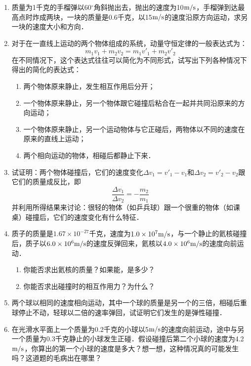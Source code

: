 \begin{enumerate}
    \item 质量为1千克的手榴弹以60$^\circ$角斜抛出去，抛出的速度为10$\text{m}/\text{s}$，手榴弹到达最高点时炸成两块，一块的质量是0.6千克，以15$\text{m}/\text{s}$的速度沿原方向运动，求另一块的速度大小和方向．
    \item 对于在一直线上运动的两个物体组成的系统，动量守恒定律的一般表达式为：
\[m_1v_1+m_2v_2=m_1v'_1+m_2v'_2 \]
    在不同情况下，这个表达式往往可以简化为不同形式，试写出下列各种情况下得出的简化的表达式：
\begin{enumerate}
    \item 两个物体原来静止，发生相互作用后分开；
    \item 一个物体原来静止，另一个物体跟它碰撞后粘合在一起并共同沿原来的方向运动；
    \item 一个物体原来静止，另一个运动物体与它正碰后，两物体以不同的速度在原来的直线上运动；
    \item 两个相向运动的物体，相碰后都静止下来．
\end{enumerate}
\item 试证明：两个物体碰撞后，它们的速度变化$\Delta v_1=v'_1-v_1$和$\Delta v_2=v'_2-v_2$跟它们的质量成反比，即
\[\frac{\Delta v_1}{\Delta v_2}=-\frac{m_2}{m_1}\]
并利用所得结果来讨论：很轻的物体（如乒兵球）跟一个很重的物体（如课桌）碰撞后，它们的速度变化有什么特征．
\item 质子的质量是$1.67\times 10^{-27}$千克，速度为$1.0\times 10^7\text{m}/\text{s}$，与一个静止的氦核碰撞后，质子以$6.0\times 10^6\text{m}/\text{s}$的速度反弹回来，氦核以$4.0\times 10^6\text{m}/\text{s}$的速度向前运动．
   \begin{enumerate}
       \item 你能否求出氦核的质量？如果能，是多少？
       \item 你能否求出碰撞时的相互作用力？为什么？
   \end{enumerate}
   \item 两个球以相同的速度相向运动，其中一个球的质量是另一个的三倍，相碰后重球停止不动，轻球以二倍的速率弹回，试证明它们发生的是弹性碰撞．
   \item 在光滑水平面上一个质量为0.2千克的小球以5$\text{m}/\text{s}$的速度向前运动，途中与另一个质量为0.3千克静止的小球发生正碰．假设碰撞后第二个小球的速度为4.2$\text{m}/\text{s}$，你算出的第一个小球的速度是多大？想一想，这种情况真的可能发生吗？这道题的毛病出在哪里？
\begin{figure}[htp]\centering
{}
\end{figure}
\end{enumerate}

